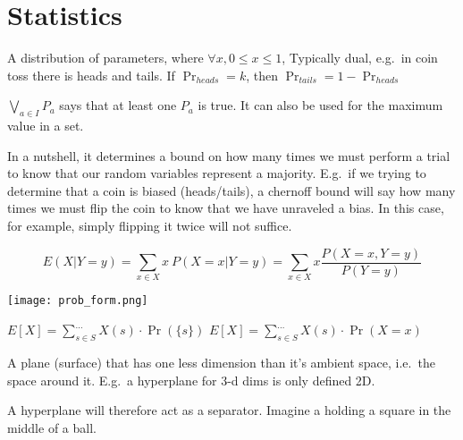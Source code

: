 \section{Statistics}

\begin{definition}\label{bernoulli}
    A distribution of parameters, where $\forall x, 0 \leq x \leq 1$,
    Typically dual, e.g.\ in coin toss there is heads and tails.
    If $\Pr_{heads} = k$, then $\Pr_{tails} = 1 - \Pr_{heads}$
\end{definition}

\begin{definition}[Bigvee]
    $\bigvee\limits_{a \in I} P_{a}$ says that at least one $P_{a}$ is true.
    It can also be used for the maximum value in a set.
\end{definition}

\begin{definition}\label{chernoff}
    In a nutshell, it determines a bound on how many times we must perform
    a trial to know that our random variables represent a majority.
    E.g.\ if we trying to determine that a coin is biased (heads/tails),
    a chernoff bound will say how many times we must flip the coin to know
    that we have unraveled a bias. In this case, for example, simply flipping it
    twice will not suffice.
\end{definition}

\begin{definition}
    $$
        E(X | Y=y) = \sum\limits_{x \in X} x \
        P(X=x | Y=y) = \sum_{x \in X} x 
        \frac{P(X=x,Y=y)}{P(Y = y)}
    $$
\end{definition}

\begin{definition}
    \texttt{[image: prob\_form.png]}
\end{definition}

\begin{definition}[Expected value]\label{expectedvalue}
    $E[X] = \sum\limits_{s \in S}^{\dots} X(s) \cdot \Pr(\{s\}) $ \newline
    $E[X] = \sum\limits_{s \in S}^{\dots} X(s) \cdot \Pr(X = x) $
\end{definition}

\begin{definition}[hyperplane]
    A plane (surface) that has one less dimension than it's ambient space,
    i.e.\ the space around it. E.g.\ a hyperplane for 3-d dims is only defined
    2D.

    A hyperplane will therefore act as a separator. Imagine a holding a 
    square in the middle of a ball.
\end{definition}

